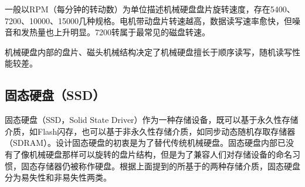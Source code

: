 一般以RPM（每分钟的转动数）为单位描述机械硬盘盘片旋转速度，存在5400、7200、10000、15000几种规格。电机带动盘片转速越高，数据读写速率愈快，但噪音和发热量也上升明显。7200转属于最常见的磁盘转速。

机械硬盘内部的盘片、磁头机械结构决定了机械硬盘擅长于顺序读写，随机读写性能较差。

\subsection{固态硬盘（SSD）}
固态硬盘\cite{ssd2009}（SSD，Solid State Driver）作为一种存储设备，既可以基于永久性存储介质，如Flash闪存，也可以基于非永久性存储介质，如同步动态随机存取存储器（SDRAM）。设计固态硬盘的初衷是为了替代传统机械硬盘。固态硬盘内部已没有了像机械硬盘那样可以旋转的盘片结构，但是为了兼容人们对存储设备的命名习惯，固态存储器仍被称作硬盘。根据上面提到的所基于的两种存储介质，固态硬盘分为易失性和非易失性两类。

